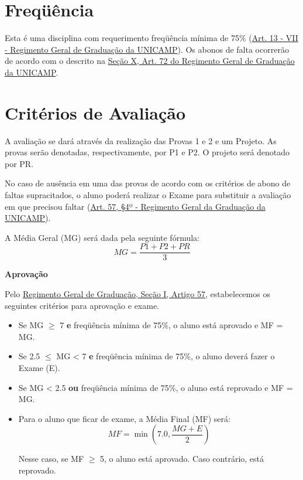 \documentclass[paper=letter, fontsize=12pt]{scrartcl} %
\begin{document}
\section{Freqüência}

Esta é uma disciplina com requerimento freqüência mínima de 75\% (\href{https://www.dac.unicamp.br/portal/graduacao/regimento-geral}{Art. 13 - VII - Regimento Geral de Graduação da UNICAMP}). Os abonos de falta ocorrerão de acordo com o descrito na \href{https://www.dac.unicamp.br/portal/graduacao/regimento-geral}{Seção X, Art. 72 do Regimento Geral de Graduação da UNICAMP}.

\section{Critérios de Avaliação}

A avaliação se dará através da realização das Provas 1 e 2 e um Projeto. As provas serão denotadas, respectivamente, por P1 e P2. O projeto será denotado por PR.

No caso de ausência em uma das provas de acordo com os critérios de abono de faltas supracitados, o aluno poderá realizar o Exame para substituir a avaliação em que precisou faltar (\href{https://www.dac.unicamp.br/portal/graduacao/regimento-geral}{Art. 57, §4º - Regimento Geral da Graduação da UNICAMP}).

\vspace{10pt}

A Média Geral (MG) será dada pela seguinte fórmula:
\[MG = \frac{P1 + P2 + PR}{3}\]

\textbf{Aprovação}

Pelo \href{https://www.dac.unicamp.br/portal/graduacao/regimento-geral}{{\color{blue} Regimento Geral de Graduação, Seção I, Artigo 57}}, estabelecemos os seguintes critérios para aprovação e exame.

\begin{itemize}
\item Se MG $\geq$ 7 \textbf{e} freqüência mínima de 75\%, o aluno está aprovado e MF = MG.

\item Se 2.5 $\leq$ MG < 7 \textbf{e} freqüência mínima de 75\%, o aluno deverá fazer o Exame (E).

\item Se MG < 2.5 \textbf{ou} freqüência mínima de 75\%, o aluno está reprovado e MF = MG.

\item Para o aluno que ficar de exame, a Média Final (MF) será:
$$MF = \min\left(7.0, \frac{MG + E}{2}\right)$$

Nesse caso, se MF $\geq$ 5, o aluno está aprovado. Caso contrário, está reprovado.


\end{itemize}
\end{document}
